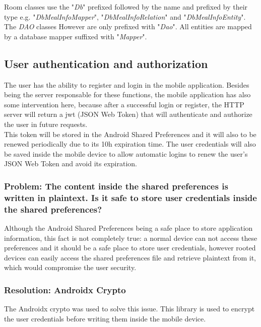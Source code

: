Room classes use the "\textit{Db}" prefixed followed by the name and prefixed by their type e.g. "\textit{DbMealInfoMapper}", "\textit{DbMealInfoRelation}" and "\textit{DbMealInfoEntity}". 
The \textit{DAO} classes However are only prefixed with "\textit{Dao}". 
All entities are mapped by a database mapper suffixed with "\textit{Mapper}".

\subsection{User authentication and authorization}

The user has the ability to register and login in the mobile application. Besides being the server responsable for these functions, the mobile application has also some intervention
here, because after a successful login or register, the HTTP server will return a jwt (JSON Web Token) that will authenticate and authorize the user in future requests.\\

This token will be stored in the Android Shared Preferences\cite{sharedpreferences} and it will also to be renewed periodically due to its 10h expiration time. The user credentials will also be saved
inside the mobile device to allow automatic logins to renew the user's JSON Web Token and avoid its expiration.\\

\subsubsection{Problem: The content inside the shared preferences is written in plaintext. Is it safe to store user credentials inside the shared preferences?}

Although the Android Shared Preferences being a safe place to store application information, this fact is not completely true:
a normal device can not access these preferences and it should be a safe place to store user credentials, however rooted devices\cite{root} can easily
access the shared preferences file and retrieve plaintext from it, which would compromise the user security.\\

\subsubsection{Resolution: Androidx Crypto}

The Androidx crypto\cite{crypto} was used to solve this issue. This library is used to encrypt the user credentials before writing them inside the mobile device.\\

